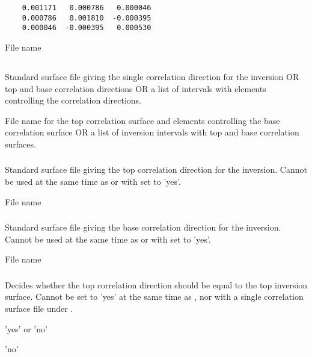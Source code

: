   \begin{verbatim}
    0.001171   0.000786   0.000046
  	0.000786   0.001810  -0.000395
  	0.000046  -0.000395   0.000530
  \end{verbatim}
   \item \Argument File name
   \item \Default
 \elist

\subsection{}
 \slist
   \item \Description Standard surface file giving the single correlation direction for the inversion OR top and base correlation directions OR a list of intervals with elements controlling the correlation directions.
   \item \Argument File name for the top correlation surface and elements controlling the base correlation surface OR a list of inversion intervals with top and base correlation surfaces.
   \item \Default
 \elist

\subsubsection{}
 \slist
   \item \Description Standard surface file giving the top correlation direction for the inversion. Cannot be used at the same time as  or with  set to 'yes'.
   \item \Argument File name
   \item \Default
 \elist

\subsubsection{}
 \slist
   \item \Description Standard surface file giving the base correlation direction for the inversion. Cannot be used at the same time as  or with  set to 'yes'.
   \item \Argument File name
   \item \Default
 \elist
 
\subsubsection{}
 \slist
   \item \Description Decides whether the top correlation direction should be equal to the top inversion surface. Cannot be set to 'yes' at the same time as , nor with a single correlation surface file under .
   \item \Argument 'yes' or 'no'
   \item \Default 'no'
 \elist

